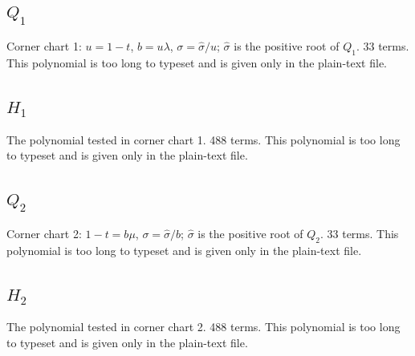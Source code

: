 \subsection*{$Q_1$}
Corner chart 1: $u=1-t$, $b=u\lambda$, $\sigma=\hat\sigma/u$; $\hat\sigma$ is the positive root of $Q_1$. 33 terms.
This polynomial is too long to typeset and is given only in the plain-text file.

\subsection*{$H_1$}
The polynomial tested in corner chart 1. 488 terms.
This polynomial is too long to typeset and is given only in the plain-text file.

\subsection*{$Q_2$}
Corner chart 2: $1-t=b\mu$, $\sigma=\hat\sigma/b$; $\hat\sigma$ is the positive root of $Q_2$. 33 terms.
This polynomial is too long to typeset and is given only in the plain-text file.

\subsection*{$H_2$}
The polynomial tested in corner chart 2. 488 terms.
This polynomial is too long to typeset and is given only in the plain-text file.


